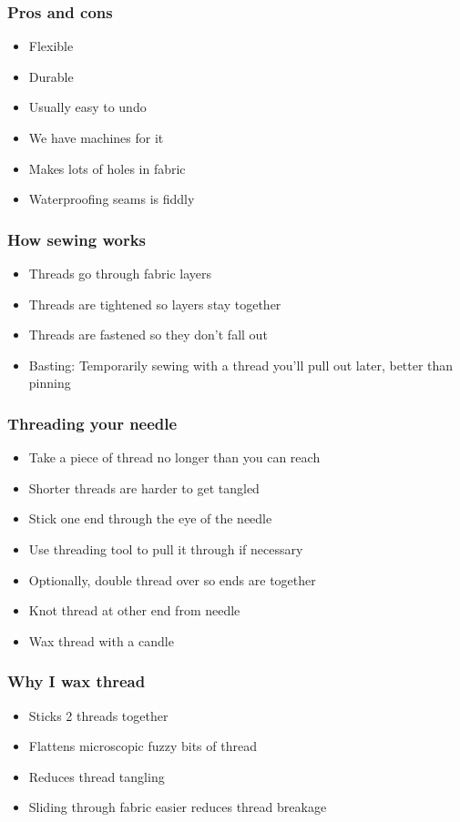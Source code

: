 \documentclass{beamer}
\begin{document}
\begin{frame}[fragile]
\frametitle{Pros and cons}
\begin{itemize}
\item Flexible
\item Durable
\item Usually easy to undo
\item We have machines for it
\item Makes lots of holes in fabric
\item Waterproofing seams is fiddly
\end{itemize}
\end{frame}

\begin{frame}[fragile]
\frametitle{How sewing works}
\begin{itemize}
\item Threads go through fabric layers
\item Threads are tightened so layers stay together
\item Threads are fastened so they don't fall out
\item Basting: Temporarily sewing with a thread you'll pull out later, better than pinning
\end{itemize}
\end{frame}

\begin{frame}[fragile]
\frametitle{Threading your needle}
\begin{itemize}
\item Take a piece of thread no longer than you can reach
\item Shorter threads are harder to get tangled
\item Stick one end through the eye of the needle
\item Use threading tool to pull it through if necessary
\item Optionally, double thread over so ends are together
\item Knot thread at other end from needle
\item Wax thread with a candle
\end{itemize}
\end{frame}

\begin{frame}[fragile]
\frametitle{Why I wax thread}
\begin{itemize}
\item Sticks 2 threads together
\item Flattens microscopic fuzzy bits of thread
\item Reduces thread tangling
\item Sliding through fabric easier reduces thread breakage
\end{itemize}
\end{frame}
\end{document}
